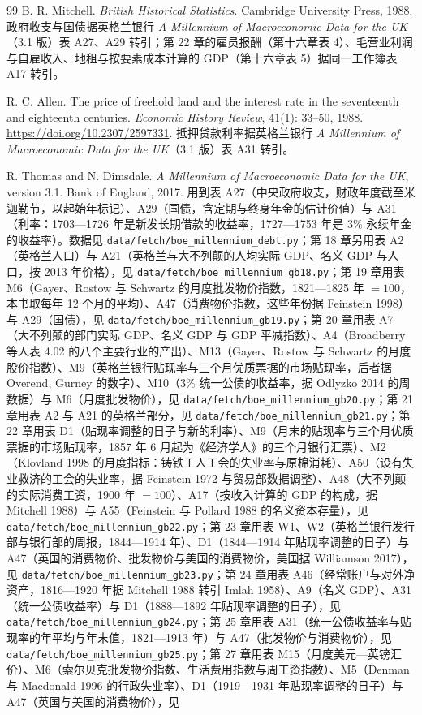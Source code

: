 \begin{thebibliography}{99}
 B. R. Mitchell. \emph{British Historical Statistics}. Cambridge University Press, 1988. 政府收支与国债据英格兰银行 \emph{A Millennium of Macroeconomic Data for the UK}（3.1 版）表 A27、A29 转引；第 22 章的雇员报酬（第十六章表 4）、毛营业利润与自雇收入、地租与按要素成本计算的 GDP（第十六章表 5）据同一工作簿表 A17 转引。

 R. C. Allen. The price of freehold land and the interest rate in the seventeenth and eighteenth centuries. \emph{Economic History Review}, 41(1): 33--50, 1988. \url{https://doi.org/10.2307/2597331}. 抵押贷款利率据英格兰银行 \emph{A Millennium of Macroeconomic Data for the UK}（3.1 版）表 A31 转引。

 R. Thomas and N. Dimsdale. \emph{A Millennium of Macroeconomic Data for the UK}, version 3.1. Bank of England, 2017. 用到表 A27（中央政府收支，财政年度截至米迦勒节，以起始年标记）、A29（国债，含定期与终身年金的估计价值）与 A31（利率：1703—1726 年是新发长期借款的收益率，1727—1753 年是 3\% 永续年金的收益率）。数据见 \texttt{data/fetch/boe\_millennium\_debt.py}；第 18 章另用表 A2（英格兰人口）与 A21（英格兰与大不列颠的人均实际 GDP、名义 GDP 与人口，按 2013 年价格），见 \texttt{data/fetch/boe\_millennium\_gb18.py}；第 19 章用表 M6（Gayer、Rostow 与 Schwartz 的月度批发物价指数，1821—1825 年 $=100$，本书取每年 12 个月的平均）、A47（消费物价指数，这些年份据 Feinstein 1998）与 A29（国债），见 \texttt{data/fetch/boe\_millennium\_gb19.py}；第 20 章用表 A7（大不列颠的部门实际 GDP、名义 GDP 与 GDP 平减指数）、A4（Broadberry 等人表 4.02 的八个主要行业的产出）、M13（Gayer、Rostow 与 Schwartz 的月度股价指数）、M9（英格兰银行贴现率与三个月优质票据的市场贴现率，后者据 Overend, Gurney 的数字）、M10（3\% 统一公债的收益率，据 Odlyzko 2014 的周数据）与 M6（月度批发物价），见 \texttt{data/fetch/boe\_millennium\_gb20.py}；第 21 章用表 A2 与 A21 的英格兰部分，见 \texttt{data/fetch/boe\_millennium\_gb21.py}；第 22 章用表 D1（贴现率调整的日子与新的利率）、M9（月末的贴现率与三个月优质票据的市场贴现率，1857 年 6 月起为《经济学人》的三个月银行汇票）、M2（Klovland 1998 的月度指标：铸铁工人工会的失业率与原棉消耗）、A50（设有失业救济的工会的失业率，据 Feinstein 1972 与贸易部数据调整）、A48（大不列颠的实际消费工资，1900 年 $=100$）、A17（按收入计算的 GDP 的构成，据 Mitchell 1988）与 A55（Feinstein 与 Pollard 1988 的名义资本存量），见 \texttt{data/fetch/boe\_millennium\_gb22.py}；第 23 章用表 W1、W2（英格兰银行发行部与银行部的周报，1844—1914 年）、D1（1844—1914 年贴现率调整的日子）与 A47（英国的消费物价、批发物价与美国的消费物价，美国据 Williamson 2017），见 \texttt{data/fetch/boe\_millennium\_gb23.py}；第 24 章用表 A46（经常账户与对外净资产，1816—1920 年据 Mitchell 1988 转引 Imlah 1958）、A9（名义 GDP）、A31（统一公债收益率）与 D1（1888—1892 年贴现率调整的日子），见 \texttt{data/fetch/boe\_millennium\_gb24.py}；第 25 章用表 A31（统一公债收益率与贴现率的年平均与年末值，1821—1913 年）与 A47（批发物价与消费物价），见 \texttt{data/fetch/boe\_millennium\_gb25.py}；第 27 章用表 M15（月度美元—英镑汇价）、M6（索尔贝克批发物价指数、生活费用指数与周工资指数）、M5（Denman 与 Macdonald 1996 的行政失业率）、D1（1919—1931 年贴现率调整的日子）与 A47（英国与美国的消费物价），见 
\end{thebibliography}
